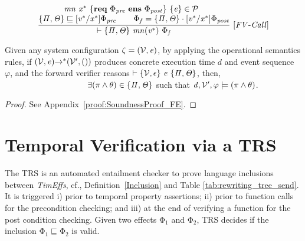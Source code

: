 \documentclass[acmsmall,10pt,review]{acmart}
\newcommand{\env}{\code{\mathcal{V}}}
\newcommand{\es}{\theta}
\newcommand{\timedEffects}{\emph{TimEffs}}
\newcommand{\effect}{{\ensuremath{\mathrm{\Phi}}}}
\newcommand{\code}[1]{{\tt{\ensuremath{\m{#1}}}}}
\newcommand{\CONTAIN}{\sqsubseteq}
\newcommand{\m}{\mathit}
\newcommand\tabref[1]{Table \textcolor{black}{\ref{#1}}.}
\newcommand\appref[1]{Appendix~\textcolor{blue}{\ref{#1}}}
\newcommand\defref[1]{Definition~\textcolor{blue}{\ref{#1}}}
\begin{document}
{  %
{{\small\begin{gather*}
\code{\frac{
\begin{matrix}
{\code{  mn  \ {x^*}\ \{\textbf{req}\ \effect_{pre}\ \textbf{ens}\  \effect_{post}\} \ \{ e \} \in \mathcal{P}\ \ }}
\\
\text{\code{ \s{ \Pi, \Theta} \CONTAIN [v^*/x^*] \effect_{pre}   
\qquad   \effect_f =  \s{ \Pi, \Theta} \cdot  [v^*/x^*]\effect_{post}}}
\end{matrix}}
{\vdash \s{ \Pi, \Theta} \ mn({v^*})  \ 
\effect_f} \ {[FV\text{-}Call]}}
\end{gather*}}}


\begin{theorem}\label{Soundness_forward_rules}
  Given any system configuration \code{\zeta = (\env, e)}, by applying the operational
  semantics rules, 
  if \code{(\env, e) {\rightarrow^*} (\env^\prime, ())} produces concrete 
  execution time \code{d} and event sequence \code{\varphi}, and the forward verifier reasons \code{ \vdash  
  \s{\env, \epsilon} \ e\  \s{\Pi, \Theta}}, then, \\
  \code{\qquad \qquad \qquad \qquad  \qquad 
   \exists (\pi\wedge \es) \in \s{\Pi, \Theta} } such that 
  \code{d, \env^\prime, \varphi  \models (\pi\wedge \es)}. 

  \end{theorem}
  
  
  \begin{proof}
    See \appref{proof:SoundnessProof_FE}.
  \end{proof}


\section{Temporal Verification via a TRS}
\label{sec:Entailment_Prover}


The TRS  is an automated entailment checker to prove language 
inclusions between \timedEffects, cf., \defref{Inclusion} and 
\tabref{tab:rewriting_tree_send} It is triggered i) prior to 
temporal property assertions; ii) prior to function calls for the 
precondition checking; and iii) at the end of verifying a function 
for the post condition checking. Given two effects 
\code{\effect_1} and \code{\effect_2}, TRS decides if the inclusion \code{\effect_1 \CONTAIN  \effect_2 } is valid. 

}
\end{document}
